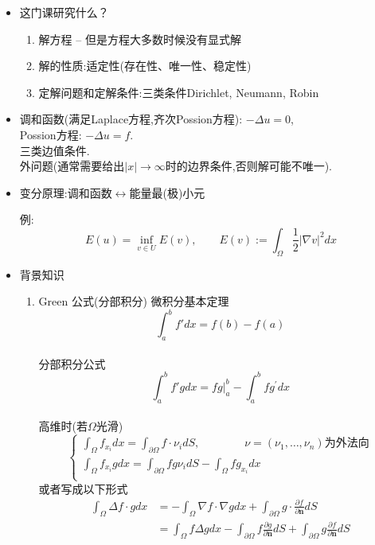 \documentclass[12pt, a4paper]{ctexart}
\begin{document}
    \begin{itemize}
        \item 这门课研究什么？
        \begin{enumerate}
            \item 解方程 -- 但是方程大多数时候没有显式解
            \item 解的性质:适定性(存在性、唯一性、稳定性)
            \item 定解问题和定解条件:三类条件\quad Dirichlet, Neumann, Robin
        \end{enumerate}
        \item 调和函数(满足Laplace方程,齐次Possion方程): $-\Delta u = 0$,\\ Possion方程: $-\Delta u = f$.\\ 三类边值条件.\\ 外问题(通常需要给出$|x|\rightarrow\infty$时的边界条件,否则解可能不唯一).
        \item 变分原理:调和函数$\leftrightarrow$能量最(极)小元
        
        例:$$E(u) = \mathop{\inf}_{v\in U} E(v), \qquad E(v) := \int_{\Omega} \frac12 | \nabla v |^2 dx$$
        \item 背景知识
        \begin{enumerate}
            \item Green 公式(分部积分)
            微积分基本定理$$\int_a^bf'dx = f(b) - f(a)$$ \\
            分部积分公式$$\int_a^bf'gdx = fg\Big|_a^b - \int_a^bfg^{\prime}dx$$\\
            高维时(若$\Omega$光滑)
            $$ \begin{cases}
                \int_{\Omega} f_{x_i}dx = \int_{\partial \Omega}f \cdot \nu_i dS, \qquad\qquad \nu = (\nu_1, \dots, \nu_n) \text{为外法向} \\
                \int_{\Omega} f_{x_i}gdx = \int_{\partial \Omega}fg\nu_idS - \int_{\Omega}fg_{x_i}dx \\
                \end{cases}$$
            或者写成以下形式
            \begin{align*} 
            \int_{\Omega} \Delta f \cdot g dx &= - \int_{\Omega} \nabla f \cdot \nabla g dx + \int_{\partial \Omega} g \cdot \frac{\partial f}{\partial \bm{n}} dS \\
            &= \int_{\Omega} f \Delta g dx - \int_{\partial \Omega} f \frac{\partial g}{\partial\bm{n}}dS + \int_{\partial \Omega} g \frac{\partial f}{\partial\bm{n}}dS
            \end{align*}
            

\end{enumerate}
\end{itemize}
\end{document}
